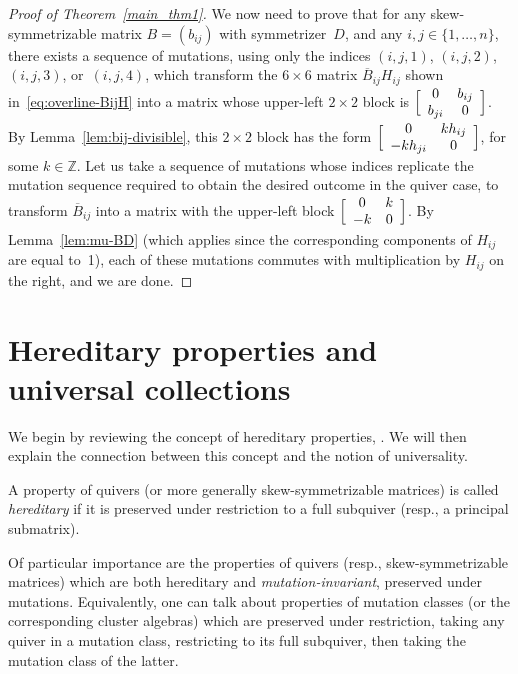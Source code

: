 \begin{proof}[Proof of Theorem~\ref{main_thm1}]
We now need to prove that for any skew-symmetrizable matrix $B=(b_{ij})$ with symmetrizer~$D$, and any $i,j\in\{1,\dots,n\}$, there exists a sequence of mutations, using only the indices $(i,j,1)$, $(i,j,2)$, $(i,j,3)$, or~$(i,j,4)$, which transform the $6\times 6$ matrix $\overline B_{ij} H_{ij}$ shown in~\eqref{eq:overline-BijH} into a matrix whose upper-left $2\times 2$ block is $\Bigl[\begin{array}{cc} 0 & b_{ij}\\ b_{ji} & 0 \end{array}\Bigr]$. 
By Lemma~\ref{lem:bij-divisible}, this $2\times 2$ block has the form $ \Bigl[\begin{array}{cc}
0 & kh_{ij} \\
-kh_{ji} & 0
\end{array}\Bigr]$, for some $k\in\mathbb{Z}$. 
Let us take a sequence of mutations whose indices replicate the mutation sequence required to obtain the desired outcome in the quiver case, \ie 
to transform $\overline B_{ij}$ into a matrix with the upper-left block $\Bigl[\begin{array}{cc}
0 & k \\
-k & 0
\end{array}\Bigr]$. 
By Lemma~\ref{lem:mu-BD} (which applies since the corresponding components of $H_{ij}$ are equal to~1), each of these mutations commutes with multiplication by $H_{ij}$ on the right, and we are done. 
\end{proof}


\section{Hereditary properties and universal collections}
\label{sec:hereditary+universal}

We begin by reviewing the concept of hereditary properties, \cf \cite[Section~4.1]{FWZ}. We will then explain the connection between this concept and the notion of universality. 

\begin{definition}
\label{def:hereditary}
A property of quivers (or more generally skew-symmetrizable matrices) is called \emph{hereditary} if it is preserved under restriction to a full subquiver (resp., a principal submatrix). 

Of particular importance are the properties of quivers (resp., skew-symmetrizable matrices) which are both hereditary and \emph{mutation-invariant}, \ie preserved under mutations. 
Equivalently, one can talk about properties of mutation classes (or the corresponding cluster algebras) which are preserved under restriction, \ie taking any quiver in a mutation class, restricting to its full subquiver, then taking the mutation class of the latter. 
\end{definition}

